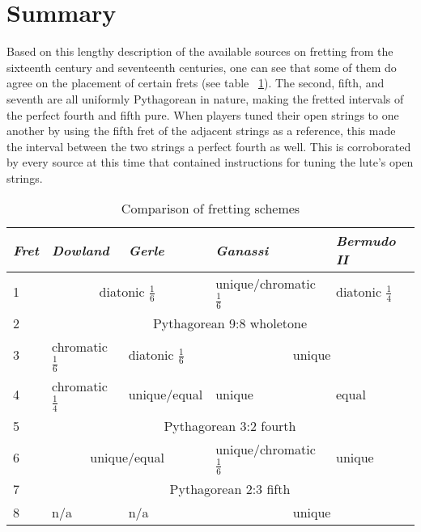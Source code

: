 \section{Summary}

Based on this lengthy description of the available sources on fretting from the sixteenth century and seventeenth
centuries, one can see that some of them do agree on the placement of certain frets (see table ~\ref{table:comparison}).
The second, fifth, and seventh are all uniformly Pythagorean in nature, making the fretted intervals of the perfect
fourth and fifth pure. When players tuned their open strings to one another by using the fifth fret of the adjacent
strings as a reference, this made the interval between the two strings a perfect fourth as well. This is corroborated by
every source at this time that contained instructions for tuning the lute's open strings.

\begin{table}[h!]
 \begin{center}
  \begin{tabular}{ l l l l l }
   \textit{Fret} & \textit{Dowland} & \textit{Gerle} & \textit{Ganassi} & \textit{Bermudo II} \\
   \hline
   1 & \multicolumn{2}{|c|}{\cellcolor[gray]{0.9}diatonic $ \frac{1}{6} $} & unique/chromatic $ \frac{1}{6} $ & \cellcolor[gray]{0.9}diatonic $ \frac{1}{4} $ \\
   2 & \multicolumn{4}{|c|}{\cellcolor[gray]{0.9}Pythagorean 9:8 wholetone} \\
   3 & chromatic $ \frac{1}{6} $ & diatonic $ \frac{1}{6} $ & \multicolumn{2}{|c|}{\cellcolor[gray]{0.9}unique} \\
   4 & chromatic $ \frac{1}{4} $ & unique/equal & unique & equal \\
   5 & \multicolumn{4}{|c|}{\cellcolor[gray]{0.9}Pythagorean 3:2 fourth} \\
   6 & \multicolumn{2}{|c|}{\cellcolor[gray]{0.9} unique/equal } & unique/chromatic $ \frac{1}{6} $ & unique \\
   7 & \multicolumn{4}{|c|}{\cellcolor[gray]{0.9}Pythagorean 2:3 fifth} \\
   8 & n/a & n/a & \multicolumn{2}{|c|}{\cellcolor[gray]{0.9}unique} \\
  \end{tabular}
 \end{center}
 \caption{Comparison of fretting schemes}
 \label{table:comparison}
\end{table}

